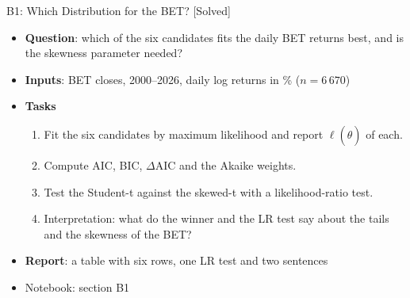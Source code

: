 \begin{frame}{B1: Which Distribution for the BET? [Solved]}
\itemsize{\footnotesize}
\begin{itemize}
\item \textbf{Question}: which of the six candidates fits the daily BET returns best, and is the skewness parameter needed?
\item \textbf{Inputs}: BET closes, 2000--2026, daily log returns in \% ($n = 6\,670$)
\item \textbf{Tasks}
\begin{enumerate}
    \item Fit the six candidates by maximum likelihood and report $\ell(\hat\theta)$ of each.
    \item Compute AIC, BIC, $\Delta$AIC and the Akaike weights.
    \item Test the Student-t against the skewed-t with a likelihood-ratio test.
    \item Interpretation: what do the winner and the LR test say about the tails and the skewness of the BET?
\end{enumerate}
\item \textbf{Report}: a table with six rows, one LR test and two sentences
\item Notebook: section B1
\end{itemize}
\end{frame}

